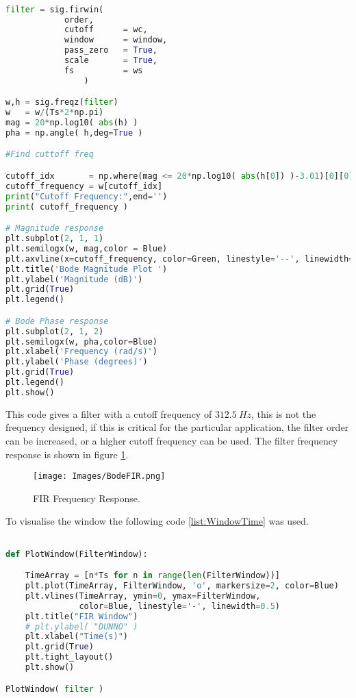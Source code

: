 \vspace{1cm}
\label{list:FirDesign}
\begin{lstlisting}[language=python, caption = Specification Definition]

filter = sig.firwin(
            order,
            cutoff      = wc, 
            window      = window, 
            pass_zero   = True, 
            scale       = True,
            fs          = ws
                )

w,h = sig.freqz(filter)
w   = w/(Ts*2*np.pi)
mag = 20*np.log10( abs(h) )
pha = np.angle( h,deg=True )   

#Find cuttoff freq

cutoff_idx       = np.where(mag <= 20*np.log10( abs(h[0]) )-3.01)[0][0]
cutoff_frequency = w[cutoff_idx]
print("Cutoff Frequency:",end='')
print( cutoff_frequency )

# Magnitude response
plt.subplot(2, 1, 1)
plt.semilogx(w, mag,color = Blue)
plt.axvline(x=cutoff_frequency, color=Green, linestyle='--', linewidth=1,label="Cutoff Frequency")
plt.title('Bode Magnitude Plot ')
plt.ylabel('Magnitude (dB)')
plt.grid(True)
plt.legend()

# Bode Phase response
plt.subplot(2, 1, 2)
plt.semilogx(w, pha,color=Blue)
plt.xlabel('Frequency (rad/s)')
plt.ylabel('Phase (degrees)')
plt.grid(True)
plt.legend()
plt.show()
\end{lstlisting}

This code gives a filter with a cutoff frequency of $312.5~Hz$, this is not the frequency designed, if this is critical for the particular application, the filter order can be increased, or a higher cutoff frequency can be used. The filter frequency response is shown in figure \ref{fig:FIRBode}.

\begin{figure}[H]
    \centering
    \texttt{[image: Images/BodeFIR.png]}
    \caption{FIR Frequency Response.}
    \label{fig:FIRBode}
\end{figure}

To visualise the window the following code \ref{list:WindowTime} was used.

\label{list:WindowTime}
\begin{lstlisting}[language=python, caption = Specification Definition]

def PlotWindow(FilterWindow):

    TimeArray = [n*Ts for n in range(len(FilterWindow))]
    plt.plot(TimeArray, FilterWindow, 'o', markersize=2, color=Blue)
    plt.vlines(TimeArray, ymin=0, ymax=FilterWindow,
               color=Blue, linestyle='-', linewidth=0.5)
    plt.title("FIR Window")
    # plt.ylabel( "DUNNO" )
    plt.xlabel("Time(s)")
    plt.grid(True)
    plt.tight_layout()
    plt.show()

PlotWindow( filter )

\end{lstlisting}

